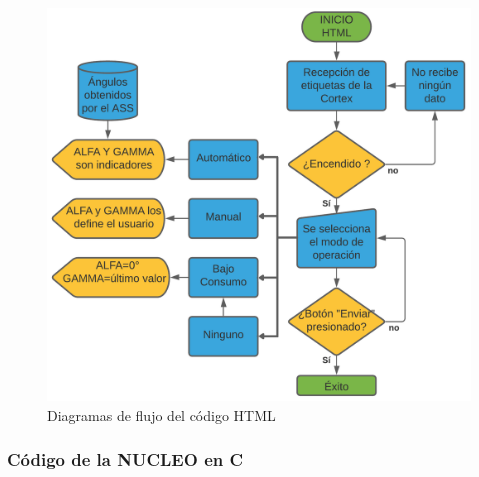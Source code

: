 \begin{figure}[H]
	\centering
	\includegraphics[width=\columnwidth]{imagenes/Diagrama HTML.png}
	\caption{Diagramas de flujo del código HTML}
	\label{fig:dia_flujHTML}
\end{figure}

\subsubsection{Código de la NUCLEO en C}

